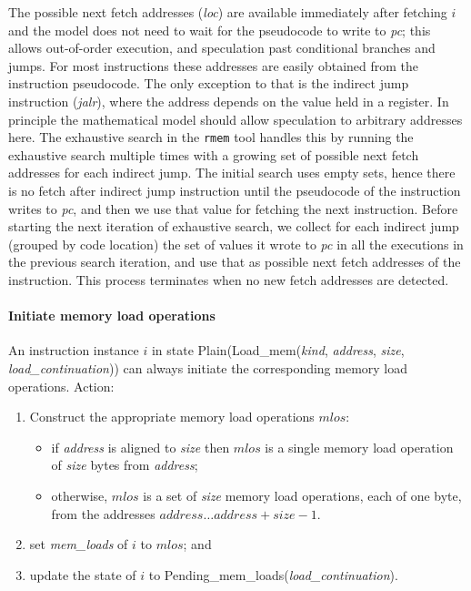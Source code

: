 \begin{commentary}
The possible next fetch addresses ({\it loc}) are available immediately after fetching $i$ and the model does not need to wait for the pseudocode to write to {\em pc}; this allows out-of-order execution, and speculation past conditional branches and jumps.
For most instructions these addresses are easily obtained from the instruction pseudocode.
The only exception to that is the indirect jump instruction ({\em jalr}), where the address depends on the value held in a register.
%
In principle the mathematical model should allow speculation to
arbitrary addresses here. 
%
The exhaustive search in the {\tt rmem} tool handles this by running the exhaustive search multiple times with a growing set of possible next fetch addresses for each indirect jump.
The initial search uses empty sets, hence there is no fetch after indirect jump instruction until the pseudocode of the instruction writes to {\em pc}, and then we use that value for fetching the next instruction.
Before starting the next iteration of exhaustive search, we collect for each indirect jump (grouped by code location) the set of values it wrote to {\em pc} in all the executions in the previous search iteration, and use that as possible next fetch addresses of the instruction.
This process terminates when no new fetch addresses are detected.
\end{commentary}

\paragraph{Initiate memory load operations}\label{omm:initiate_load}
An instruction instance $i$ in state {\sc Plain}({\sc Load\_mem}({\it kind}, {\it address}, {\it size}, {\it load\_continuation})) can always initiate the corresponding memory load operations.
Action:
\begin{enumerate}
\item Construct the appropriate memory load operations $mlos$:
  \begin{itemize}
  \item if {\it address} is aligned to {\it size} then $mlos$ is a single memory load operation of {\it size} bytes from {\it address};
  \item otherwise, $mlos$ is a set of {\it size} memory load operations, each of one byte, from the addresses $\textit{address}\ldots\textit{address}+\textit{size}-1$.
  \end{itemize}
\item set {\it mem\_loads} of $i$ to $mlos$; and
\item update the state of $i$ to {\sc Pending\_mem\_loads}({\it load\_continuation}).
\end{enumerate}


